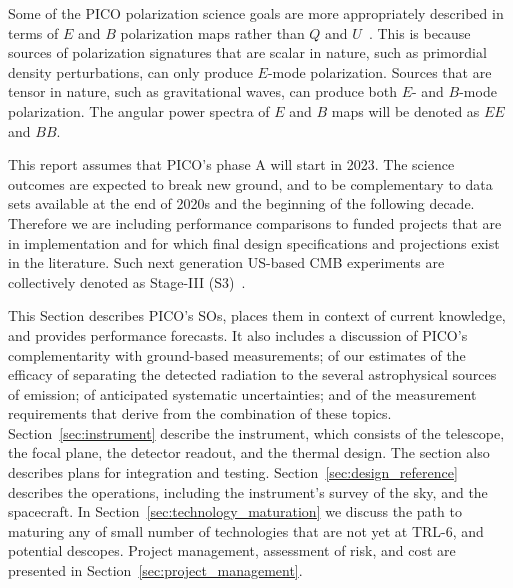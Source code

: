 \documentclass[PICOReport.tex]{subfiles}
\begin{document}

Some of the PICO polarization science goals are more appropriately described in terms of $E$ and $B$ polarization maps rather than $Q$ and $U$~\cite{zaldarriaga97,kamionkowski98}. This is because sources of polarization signatures that are scalar in nature, such as primordial density perturbations, can only produce $E$-mode polarization. Sources that are tensor in nature, such as gravitational waves, can produce both $E$- and $B$-mode polarization. The angular power spectra of $E$ and $B$ maps will be denoted as $EE$ and $BB$.

This report assumes that PICO's phase A will start in 2023. The science outcomes are expected to break new ground, and to be complementary to data sets available at the end of 2020s and the beginning of the following decade. Therefore we are including performance comparisons to funded projects that are in implementation and for which final design specifications and projections exist in the literature. Such next generation US-based CMB experiments are collectively denoted as Stage-III (S3)~\citep{advancedact,spt3g,so,class_overview,biceparray,spider,piper}. 

This Section describes PICO's \ac{SOs}, places them in context of current knowledge, and provides performance forecasts. It also includes a discussion of PICO's complementarity with ground-based measurements; of our estimates of the efficacy of separating the detected radiation to the several astrophysical sources of emission; of anticipated systematic uncertainties; and of the measurement requirements that derive from the combination of these topics.  Section~\ref{sec:instrument} describe the instrument, which consists of the telescope, the focal plane, the detector readout, and the thermal design. The section also describes plans for integration and testing. Section~\ref{sec:design_reference} describes the operations, including the instrument's survey of the sky, and the spacecraft. In Section~\ref{sec:technology_maturation} we discuss the path to maturing any of small number of technologies that are not yet at TRL-6, and potential descopes. Project management, assessment of risk, and cost are presented in Section~\ref{sec:project_management}. 


\end{document}
